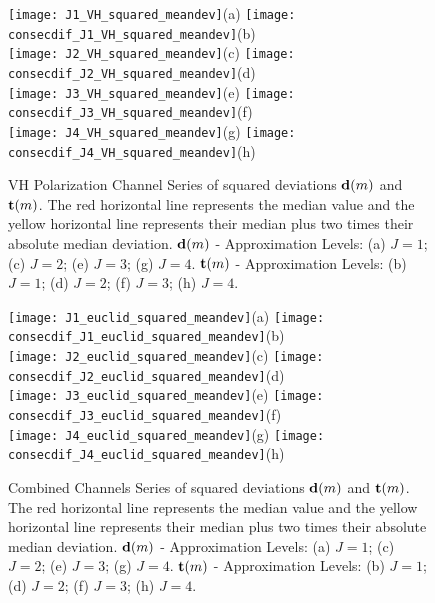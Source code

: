 \documentclass[journal]{IEEEtran}
\newcommand{\vd}{{\textbf d}}
\newcommand{\vt}{{\textbf t}}
\begin{document}
\begin{figure}[htp!]
\texttt{[image: J1\_VH\_squared\_meandev]}(a)
\texttt{[image: consecdif\_J1\_VH\_squared\_meandev]}(b)\\
\texttt{[image: J2\_VH\_squared\_meandev]}(c)
\texttt{[image: consecdif\_J2\_VH\_squared\_meandev]}(d)\\
\texttt{[image: J3\_VH\_squared\_meandev]}(e)
\texttt{[image: consecdif\_J3\_VH\_squared\_meandev]}(f)\\
\texttt{[image: J4\_VH\_squared\_meandev]}(g)
\texttt{[image: consecdif\_J4\_VH\_squared\_meandev]}(h)
\caption{{\sc VH Polarization  Channel} Series of squared deviations $\vd(m)$ and $\vt(m)$. The red horizontal line represents the median value and the yellow horizontal line represents their median plus two times their absolute median deviation.  $\vd(m)$ - Approximation Levels:  (a) $J=1$; (c) $J=2$; (e) $J=3$; (g) $J=4$. $\vt(m)$ - Approximation Levels:  (b) $J=1$; (d) $J=2$; (f) $J=3$; (h) $J=4$. 
}
\label{F:squared_J1-4_VH}
\end{figure}

\begin{figure}[htp!]
\texttt{[image: J1\_euclid\_squared\_meandev]}(a)
\texttt{[image: consecdif\_J1\_euclid\_squared\_meandev]}(b)\\
\texttt{[image: J2\_euclid\_squared\_meandev]}(c)
\texttt{[image: consecdif\_J2\_euclid\_squared\_meandev]}(d)\\
\texttt{[image: J3\_euclid\_squared\_meandev]}(e)
\texttt{[image: consecdif\_J3\_euclid\_squared\_meandev]}(f)\\
\texttt{[image: J4\_euclid\_squared\_meandev]}(g)
\texttt{[image: consecdif\_J4\_euclid\_squared\_meandev]}(h)
\caption{{\sc Combined Channels} Series of squared deviations $\vd(m)$ and $\vt(m)$. The red horizontal line represents the median value  and the yellow horizontal line represents their median plus two times their absolute median deviation.  $\vd(m)$ - Approximation Levels:  (a) $J=1$; (c) $J=2$; (e) $J=3$; (g) $J=4$. $\vt(m)$ - Approximation Levels:  (b) $J=1$; (d) $J=2$; (f) $J=3$; (h) $J=4$. 
}
\label{F:squared_J1-4_euclid}
\end{figure}
\end{document}
